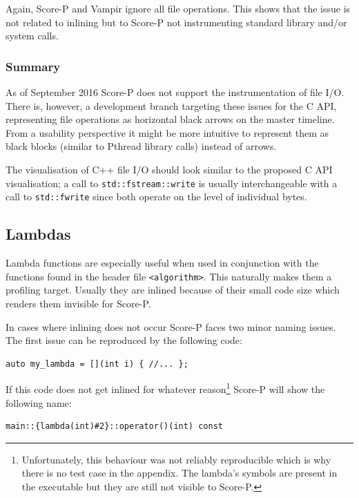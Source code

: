 Again, Score-P and Vampir ignore all file operations. This shows that the issue is not related to inlining but to Score-P not instrumenting standard library and/or system calls.

\subsubsection{Summary}

As of September 2016 Score-P does not support the instrumentation of file I/O. There is, however, a development branch targeting these issues for the C API, representing file operations as horizontal black arrows on the master timeline. From a usability perspective it might be more intuitive to represent them as black blocks (similar to Pthread library calls) instead of arrows.

The visualisation of C++ file I/O should look similar to the proposed C API visualisation; a call to \texttt{std::fstream::write} is usually interchangeable with a call to \texttt{std::fwrite} since both operate on the level of individual bytes.

\subsection{Lambdas}

Lambda functions are especially useful when used in conjunction with the functions found in the header file \texttt{<algorithm>}. This naturally makes them a profiling target. Usually they are inlined because of their small code size which renders them invisible for Score-P.

In cases where inlining does not occur Score-P faces two minor naming issues. The first issue can be reproduced by the following code:

\begin{verbatim}
auto my_lambda = [](int i) { //... };
\end{verbatim}

\noindent If this code does not get inlined for whatever reason\footnote{Unfortunately, this behaviour was not reliably reproducible which is why there is no test case in the appendix. The lambda's symbols are present in the executable but they are still not visible to Score-P.} Score-P will show the following name:

\begin{verbatim}
main::{lambda(int)#2}::operator()(int) const
\end{verbatim}

